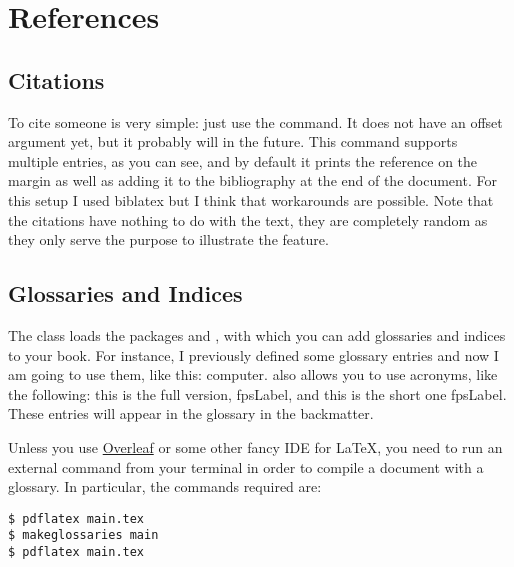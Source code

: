 \chapter{References}

\section{Citations}

To cite someone  is very simple: just 
use the  command. It does 
not have an offset argument yet, but it probably will in the future. 
This command supports multiple entries, as you can see, and by default 
it prints the reference on the margin as well as adding it to the 
bibliography at the end of the document. For this setup I used biblatex 
but I think that workarounds are possible. Note that 
the citations have nothing to do with the text, they are completely 
random as they only serve the purpose to illustrate the feature.

\section{Glossaries and Indices}

The  class loads the packages  and 
, with which you can add glossaries and indices to 
your book. For instance, I previously defined some glossary entries and 
now I am going to use them, like this: \gls{computer}. 
 also allows you to use acronyms, like the 
following: this is the full version, \acrfull{fpsLabel}, and this is the 
short one \acrshort{fpsLabel}. These entries will appear in the glossary 
in the backmatter.

Unless you use \href{https://www.overleaf.com}{Overleaf} or some other 
fancy IDE for \LaTeX, you need to run an external command from your 
terminal in order to compile a document with a glossary. In particular, 
the commands required are:

\begin{lstlisting}[style=kaolstplain]
$ pdflatex main.tex
$ makeglossaries main
$ pdflatex main.tex
\end{lstlisting}


